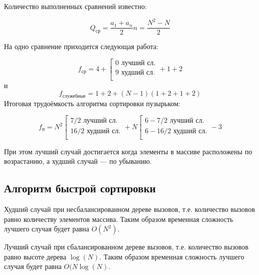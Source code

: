 Количество выполненных сравнений известно:

\begin{equation}
Q_{\text{ср}} = \frac{a_{1} + a_{n}}{2} n = \frac{N^{2} - N}{2}
\end{equation}

На одно сравнение приходится следующая работа:

\begin{equation}
	f_{\text{ср}} = 4 + 
	\left[
		\begin{array}{ccc}
			0 \text{ лучший сл.}\\
			9 \text{ худший сл.}\\
		\end{array}
	\right.
	 + 1 + 2
\end{equation}
и 
\begin{equation}
f_{\text{служебные}} = 1 + 2 + (N - 1)(1 + 2 + 1 + 2)
\end{equation}
Итоговая трудоёмкость алгоритма сортировки пузырьком:

\begin{equation}
	f_{\text{п}} = N^{2} 
	\left[
		\begin{array}{ccc}
			7 / 2 \text{ лучший сл.}\\
			16 / 2 \text{ худший сл.}\\
		\end{array}
	\right.
	+ N
	\left[
		\begin{array}{ccc}
			6 - 7 / 2 \text{ лучший сл.}\\
			6 - 16 / 2 \text{ худший сл.}\\
		\end{array}
	\right.
	- 3
\end{equation}

При этом лучший случай достигается когда элементы в массиве расположены по возрастанию, а худший случай --- по убыванию. %

\subsection{Алгоритм быстрой сортировки}

Худший случай при несбалансированном дереве вызовов, т.е. количество вызовов равно количеству элементов массива. Таким образом временная сложность лучшего случая будет равна $O(N^{2})$.

Лучший случай при сбалансированном дереве вызовов, т.е. количество вызовов равно высоте дерева $\log(N)$. Таким образом временная сложность лучшего случая будет равна $O(N\log(N)$.


